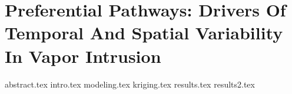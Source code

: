 \documentclass[../thesis.tex]{subfiles}
\begin{document}
\chapter{Preferential Pathways: Drivers Of Temporal And Spatial Variability In Vapor Intrusion}

{abstract.tex}
{intro.tex}
{modeling.tex}
{kriging.tex}
{results.tex}
{results2.tex}


\begin{comment}

Introduction:

Temporal variability issue in VI.
ASU and Indie houses purchases to deal investigate aspects of this.
Both sites revealed PPs.

Examples of PPs:
- Leaky pipe & long-distance sewer transport - Indie
- Land drain - ASU house
- Sewer type
  - Pennell Boston version
  - Danish study

ASU house in particularly interesting because of the closing of PP/LD.
- What happened?
  - Reduction in variability (figure)
  - Reduction is sub-surface spatial variability (figure)
  - Change in relationship between p_in and c_in (figure)
- (3) allows us to mechanistically investigate what happened with models. Answer questions like:
  - Why the change in p_in and c_in relationship?
  - Which conditions give rise to the significant effect of a PP of this kind?

p_in and c_in analysis at Indie shows a quite different (weaker) relationship (figure)
- Why?
  - Harder to model as we do not know as much of the PP
  - Kriging of soil-gas data to give an idea of what went on.

Method:

ASU house:
- Site description and subsequent model development (figure)
  - Gravel sub-base
  - Motivation for PP BCs
    - Groundwater source concentration in pipe
      - Infiltration (depth of sewer in relation to groundwater + happened at Indie)
      - Guo manhole measurements
    - Pressure gauge/air source (just simplest approach and many approaches could have been taken)

Kriging:
- I need to review this...

Results:

ASU house:
- PP increased advective potential. Conditions:
  - Contaminated PP
  - Gravel sub-base
  - Air source

Indie:
- A bit unclear, but Kriging shows:
  - Sewer likely leaks somewhere under the front lawn.
  - May explain the different behavior, i.e. the distance separation is a middle-ground between ASU pre and post closing of LD.

Conclusion:

Screening for PPs should be routine part of VI investigations.

Examples:
- Danish suggestions (sample in sewers/manholes and behind water traps)
- CPM could be useful
  - Combined with covering manhole to see if the building communicates with the sewer

\end{comment}
\end{document}
